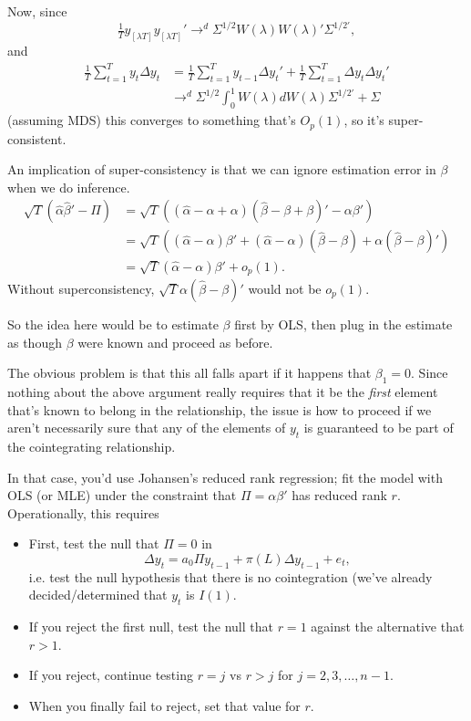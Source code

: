 Now, since
\[\tfrac{1}{T} y_{[\lambda T]} y_{[\lambda T]}' \to^d \Sigma^{1/2} W(\lambda)W(\lambda)' \Sigma^{1/2\prime},\]
and
\begin{align*}
  \tfrac{1}{T} \sum_{t=1}^T y_t \Delta y_t
  &= \tfrac{1}{T} \sum_{t=1}^T y_{t-1} \Delta y_t' + \tfrac{1}{T} \sum_{t=1}^T \Delta y_t \Delta y_t' \\
  &\to^d \Sigma^{1/2} \int_0^1 W(\lambda) dW(\lambda) \Sigma^{1/2\prime} + \Sigma
\end{align*}
(assuming MDS) this converges to something that's $O_p(1)$, so it's
super-consistent.

An implication of super-consistency is that we can ignore estimation
error in $\beta$ when we do inference.
\begin{align*}
  \sqrt{T} (\hat \alpha \hat \beta' - \Pi)
  &= \sqrt{T} ((\hat \alpha - \alpha + \alpha) (\hat \beta - \beta + \beta)' - \alpha\beta') \\
  &= \sqrt{T} ((\hat \alpha - \alpha) \beta' + (\hat \alpha - \alpha) (\hat \beta - \beta) + \alpha (\hat \beta - \beta)') \\
  &= \sqrt{T} (\hat \alpha - \alpha) \beta' + o_p(1).
\end{align*}
Without superconsistency, $\sqrt{T} \alpha (\hat \beta - \beta)'$ would not be $o_p(1)$.

So the idea here would be to estimate $\beta$ first by OLS, then plug in
the estimate as though $\beta$ were known and proceed as before.

The obvious problem is that this all falls apart if it happens that
$\beta_1=0$.  Since nothing about the above argument really requires that
it be the \textit{first} element that's known to belong in the
relationship, the issue is how to proceed if we aren't necessarily
sure that any of the elements of $y_t$ is guaranteed to be part of the
cointegrating relationship.

In that case, you'd use Johansen's reduced rank regression; fit the
model with OLS (or MLE) under the constraint that $\Pi = \alpha\beta'$ has
reduced rank $r$.  Operationally, this requires
\begin{itemize}
\item First, test the null that $\Pi = 0$ in
  \[ \Delta y_t = a_0 \Pi y_{t-1} + \pi(L) \Delta y_{t-1} + e_t, \] i.e. test the null
  hypothesis that there is no cointegration (we've already
  decided/determined that $y_t$ is $I(1)$.
\item If you reject the first null, test the null that $r=1$ against
  the alternative that $r>1$.
\item If you reject, continue testing $r=j$ vs $r>j$ for
  $j=2,3,\dots,n-1$.
\item When you finally fail to reject, set that value for $r$.
\end{itemize}

